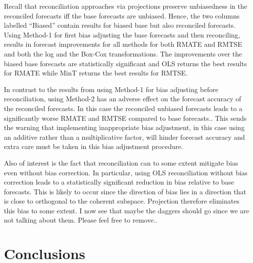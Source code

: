 \documentclass[12pt]{article}
\theoremstyle{definition}
\begin{document}
{\begin{table}[!b]
\end{table}

Recall that reconciliation approaches via projections preserve unbiasedness in the reconciled forecasts iff the base forecasts are unbiased. Hence, the two columns labelled ``Biased'' contain results for biased base but also reconciled forecasts. Using Method-1 for first bias adjusting the base forecasts and then reconciling, results in forecast improvements for all methods {\color{blue} for both RMATE and RMTSE and} both the log and the Box-Cox transformations.  {\color{blue}The improvements over the biased base forecasts are statistically significant and OLS returns the best results for RMATE while MinT returns the best results for RMTSE.} %

In contrast to the results from using Method-1 for bias adjusting before reconciliation, using Method-2 has an adverse effect on the forecast accuracy of the reconciled forecasts. In this case the reconciled unbiased forecasts {\color{blue}leads to a significantly worse RMATE and RMTSE compared to base forecasts.}. This sends the warning that implementing inappropriate bias adjustment, in this case using an additive rather than a multiplicative factor, will hinder forecast accuracy and extra care must be taken in this bias adjustment procedure.

{\color{blue} Also  of interest is the fact that reconciliation can to some extent mitigate bias even without bias correction.  In particular, using OLS reconciliation without bias correction leads to a statistically significant reduction in bias relative to base forecasts.  This is likely to occur since the direction of bias lies in a direction that is close to orthogonal to the coherent subspace.  Projection therefore eliminates this bias to some extent.}{\color{red} I now see that maybe the daggers should go since we are not talking about them. Please feel free to remove.}.

\section{Conclusions}\label{sec:conclusions}


}
\end{document}
